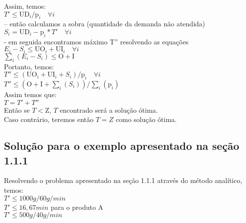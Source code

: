 \documentclass{book}
\begin{document}
 		Assim, temos: \\
 		
 		$ T' \leq \textrm{UD}_i/\textrm{p}_i \quad \forall i$ \\
 		
 		-- então calculamos a sobra (quantidade da demanda não atendida) \\
 		
 		$S_i = \textrm{UD}_i - \textrm{p}_i * T' \quad \forall i$ \\
 
 - em seguida encontramos máximo T'' resolvendo as equações \\
 
$E_i - S_i \leq \textrm{UO}_i + \textrm{UI}_i \quad \forall i$ \\

$\sum_i{(E_i- S_i)} \leq \textrm{O} + \textrm{I}$ \\

Portanto, temos: \\
 
$T'' \leq (\textrm{UO}_i + \textrm{UI}_i + S_i) / \textrm{p}_i  \quad \forall i$ \\

$T'' \leq (\textrm{O} + \textrm{I} + \sum_i{(S_i)}) / \sum_i{(\textrm{p}_i)}$ \\

Assim temos que: \\

$T = T' + T''$ \\

Então se $T<\textrm{Z}$, $T$ encontrado será a solução ótima. \\

Caso contrário, teremos então $T=Z$ como solução ótima. \\

\subsection{Solução para o exemplo apresentado na seção 1.1.1}

Resolvendo o problema apresentado na seção 1.1.1 através do método analítico, temos: \\

$T' \leq 1000g / 60g/min$ \\

$T' \leq 16,67 min$ \quad para o produto A \\

$T' \leq 500g / 40g/min$ \\
\end{document}

